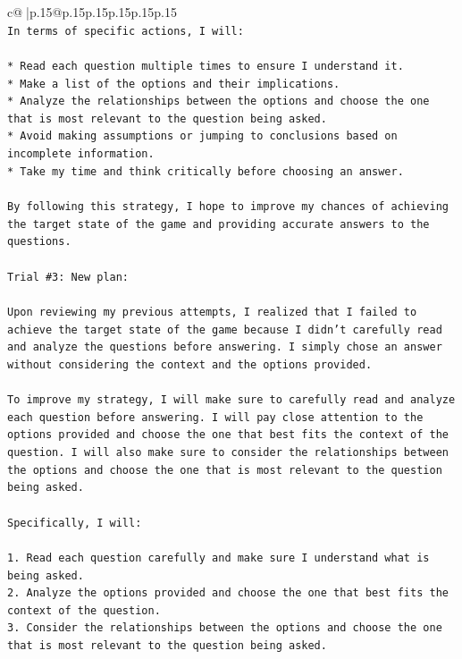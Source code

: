 \documentclass{article}
\begin{document}
{\begin{supertabular}{c@{$\;$}|p{.15\linewidth}@{}p{.15\linewidth}p{.15\linewidth}p{.15\linewidth}p{.15\linewidth}p{.15\linewidth}}
{{{\\ 
\texttt{In terms of specific actions, I will:} \\
\\ 
\texttt{* Read each question multiple times to ensure I understand it.} \\
\texttt{* Make a list of the options and their implications.} \\
\texttt{* Analyze the relationships between the options and choose the one that is most relevant to the question being asked.} \\
\texttt{* Avoid making assumptions or jumping to conclusions based on incomplete information.} \\
\texttt{* Take my time and think critically before choosing an answer.} \\
\\ 
\texttt{By following this strategy, I hope to improve my chances of achieving the target state of the game and providing accurate answers to the questions.} \\
\\ 
\texttt{Trial \#3: New plan: } \\
\\ 
\texttt{Upon reviewing my previous attempts, I realized that I failed to achieve the target state of the game because I didn't carefully read and analyze the questions before answering. I simply chose an answer without considering the context and the options provided. } \\
\\ 
\texttt{To improve my strategy, I will make sure to carefully read and analyze each question before answering. I will pay close attention to the options provided and choose the one that best fits the context of the question. I will also make sure to consider the relationships between the options and choose the one that is most relevant to the question being asked.} \\
\\ 
\texttt{Specifically, I will:} \\
\\ 
\texttt{1. Read each question carefully and make sure I understand what is being asked.} \\
\texttt{2. Analyze the options provided and choose the one that best fits the context of the question.} \\
\texttt{3. Consider the relationships between the options and choose the one that is most relevant to the question being asked.} \\
}}}
\end{supertabular}}
\end{document}
